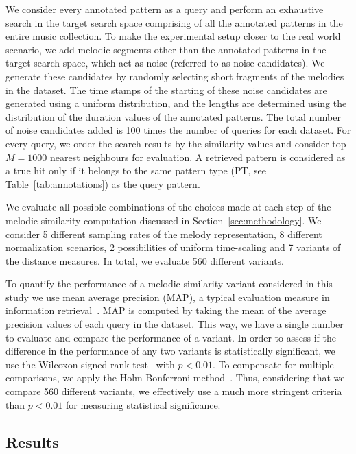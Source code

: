 We consider every annotated pattern as a query and perform an exhaustive search in the target search space comprising of all the annotated patterns in the entire music collection. To make the experimental setup closer to the real world scenario, we add melodic segments other than the annotated patterns in the target search space, which act as noise (referred to as noise candidates). We generate these candidates by randomly selecting short fragments of the melodies in the dataset. The time stamps of the starting of these noise candidates are generated using a uniform distribution, and the lengths are determined using the distribution of the duration values of the annotated patterns. The total number of noise candidates added is 100 times the number of queries for each dataset. For every query, we order the search results by the similarity values and consider top $M=1000$ nearest neighbours for evaluation. A retrieved pattern is considered as a true hit only if it belongs to the same pattern type (PT, see Table~\ref{tab:annotations}) as the query pattern. 

We evaluate all possible combinations of the choices made at each step of the melodic similarity computation discussed in Section~\ref{sec:methodology}. We consider 5 different sampling rates of the melody representation, 8 different normalization scenarios, 2 possibilities of uniform time-scaling and 7 variants of the distance measures. In total, we evaluate 560 different variants.

To quantify the performance of a melodic similarity variant considered in this study we use mean average precision (MAP), a typical evaluation measure in information retrieval~\citep{manning2008introduction}. MAP is computed by taking the mean of the average precision values of each query in the dataset. This way, we have a single number to evaluate and compare the performance of a variant. In order to assess if the difference in the performance of any two variants is statistically significant, we use the Wilcoxon signed rank-test~\citep{wilcoxon1945individual} with $p < 0.01$. To compensate for multiple comparisons, we apply the Holm-Bonferroni method~\citep{holm1979simple}. Thus, considering that we compare 560 different variants, we effectively use a much more stringent criteria than $p < 0.01$ for measuring statistical significance.


\subsection{Results}


